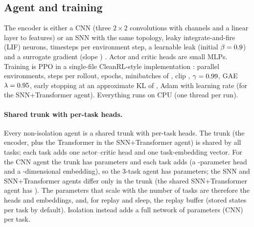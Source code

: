 \documentclass[10pt]{article}
\begin{document}
\subsection{Agent and training}
\label{sec:agent}
The encoder is either a CNN (three $2{\times}2$ convolutions with \convChannels channels and a linear layer to
\featDim features) or an SNN with the same topology, leaky integrate-and-fire (LIF) neurons, \snnT timesteps per
environment step, a learnable leak (initial $\beta=0.9$) and a surrogate gradient (slope \surrogateSlope)
\citep{neftci2019surrogate}. Actor and critic heads are small MLPs. Training is PPO \citep{schulman2017proximal}
in a single-file CleanRL-style implementation \citep{huang2022cleanrl}: \numEnvs parallel environments,
\numSteps steps per rollout, \updateEpochs epochs, minibatches of \minibatch, clip \clipCoef, $\gamma=0.99$,
GAE $\lambda=0.95$, early stopping at an approximate KL of \targetKl, Adam with learning rate \lrFlat
(\lrHybrid for the SNN+Transformer agent). Everything runs on CPU (one thread per run).

\paragraph{Shared trunk with per-task heads.} Every non-isolation agent is a shared trunk with per-task heads. The
trunk (the encoder, plus the Transformer in the SNN+Transformer agent) is shared by all tasks; each task adds one
actor--critic head and one task-embedding vector. For the CNN agent the trunk has \paramsCnnTrunk parameters and each
task adds \paramsPerTaskShared (a \paramsHead-parameter head and a \paramsTaskEmb-dimensional embedding), so the
3-task agent has \paramsCnnShared parameters; the SNN and SNN+Transformer agents differ only in the trunk (the shared
SNN+Transformer agent has \paramsHybridShared). The parameters that scale with the number of tasks are therefore the
heads and embeddings, and, for replay and sleep, the replay buffer (\bufferPerTask stored states per task by default).
Isolation instead adds a full network of \paramsCnnPerTask parameters (CNN) per task.
\end{document}
